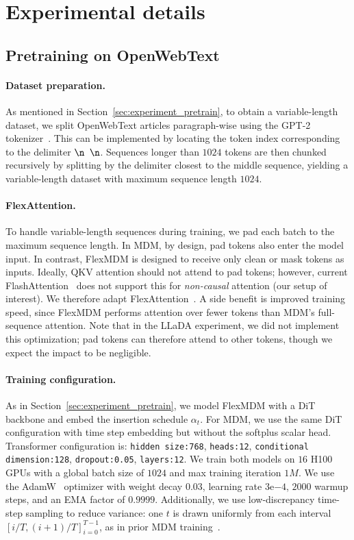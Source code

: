 \section{Experimental details}
\label{sec:appendix_exp_detail}
\subsection{Pretraining on OpenWebText}
\paragraph{Dataset preparation.}
As mentioned in Section~\ref{sec:experiment_pretrain}, to obtain a variable-length dataset, we split OpenWebText articles paragraph-wise using the GPT-2 tokenizer~\cite{radford2019rewon}. This can be implemented by locating the token index corresponding to the delimiter $\verb|\n |\verb|\n|$. Sequences longer than $1024$ tokens are then chunked recursively by splitting by the delimiter closest to the middle sequence, yielding a variable-length dataset with maximum sequence length $1024$.

\paragraph{FlexAttention.}
To handle variable-length sequences during training, we pad each batch to the maximum sequence length. In MDM, by design, pad tokens also enter the model input. In contrast, FlexMDM is designed to receive only clean or mask tokens as inputs. Ideally, QKV attention should not attend to pad tokens; however, current FlashAttention~\citep{dao2022flashattention} does not support this for \emph{non-causal} attention (our setup of interest). We therefore adapt FlexAttention~\citep{dong2024flex}. A side benefit is improved training speed, since FlexMDM performs attention over fewer tokens than MDM’s full-sequence attention. Note that in the LLaDA experiment, we did not implement this optimization; pad tokens can therefore attend to other tokens, though we expect the impact to be negligible.

\paragraph{Training configuration.}
As in Section~\ref{sec:experiment_pretrain}, we model FlexMDM with a DiT~\cite{peebles2023scalable} backbone and embed the insertion schedule $\alpha_t$. For MDM, we use the same DiT configuration with time step embedding but without the softplus scalar head. Transformer configuration is: \texttt{hidden size:768}, \texttt{heads:12}, \texttt{conditional dimension:128}, \texttt{dropout:0.05}, \texttt{layers:12}.
We train both models on $16$ H100 GPUs with a global batch size of $1024$ and max training iteration $1M$. We use the AdamW~\citep{loshchilov2017decoupled} optimizer with weight decay $0.03$, learning rate $3\mathrm{e}{-4}$, $2000$ warmup steps, and an EMA factor of $0.9999$. Additionally, we use low-discrepancy time-step sampling to reduce variance: one $t$ is drawn uniformly from each interval ${[i/T,(i+1)/T]}_{i=0}^{T-1}$, as in prior MDM training~\citep{shi2024simplified}.

